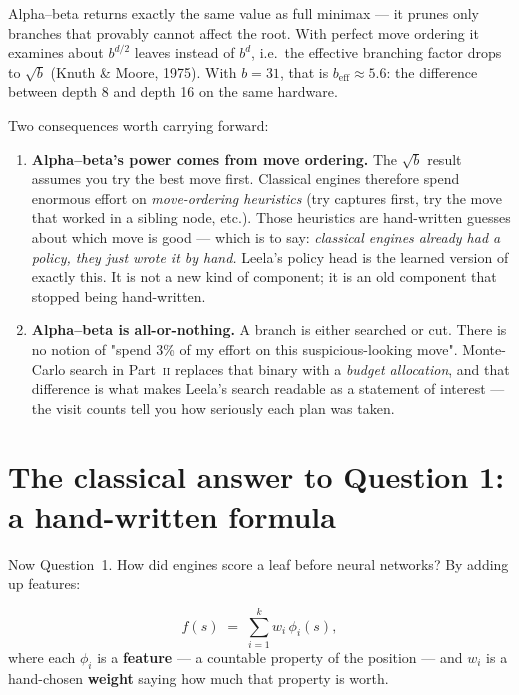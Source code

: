 \begin{established}
Alpha--beta returns exactly the same value as full minimax --- it prunes only branches that
provably cannot affect the root. With perfect move ordering it examines about $b^{d/2}$
leaves instead of $b^{d}$, i.e.\ the effective branching factor drops to $\sqrt{b}$
(Knuth \& Moore, 1975). With $b=31$, that is $b_{\text{eff}} \approx 5.6$: the difference
between depth 8 and depth 16 on the same hardware.
\end{established}

Two consequences worth carrying forward:

\begin{enumerate}
\item \textbf{Alpha--beta's power comes from move ordering.} The $\sqrt{b}$ result assumes
  you try the best move first. Classical engines therefore spend enormous effort on
  \emph{move-ordering heuristics} (try captures first, try the move that worked in a
  sibling node, etc.). Those heuristics are hand-written guesses about which move is good
  --- which is to say: \emph{classical engines already had a policy, they just wrote it by
  hand.} Leela's policy head is the learned version of exactly this. It is not a new kind of
  component; it is an old component that stopped being hand-written.
\item \textbf{Alpha--beta is all-or-nothing.} A branch is either searched or cut. There is
  no notion of "spend 3\% of my effort on this suspicious-looking move". Monte-Carlo search
  in Part~\textsc{ii} replaces that binary with a \emph{budget allocation}, and that
  difference is what makes Leela's search readable as a statement of interest --- the visit
  counts tell you how seriously each plan was taken.
\end{enumerate}

\section{The classical answer to Question 1: a hand-written formula}

Now Question~1. How did engines score a leaf before neural networks? By adding up features:

\begin{equation}
  \label{eq:handeval}
  f(s) \;=\; \sum_{i=1}^{k} w_i\,\phi_i(s),
\end{equation}
where each $\phi_i$ is a \textbf{feature} --- a countable property of the position --- and
$w_i$ is a hand-chosen \textbf{weight} saying how much that property is worth.

